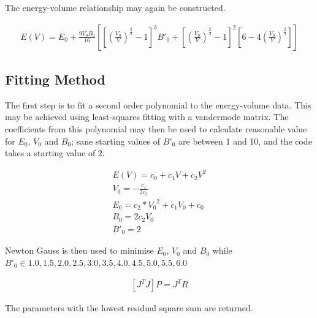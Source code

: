 \documentclass[12pt,twoside]{manual}
\begin{document}
The energy-volume relationship may again be constructed\cite{crystaleos}.

\begin{equation}
\begin{split}
E(V) = E_0 + \frac{9 V_0 B_0}{16} \left[ \left[ \left(\frac{V_0}{V} \right)^{\frac{2}{3}}-1\right]^{3} {B'}_0 + \left[ \left(\frac{V_0}{V} \right)^{\frac{2}{3}}-1\right]^{2} \left[6 - 4 \left(\frac{V_0}{V} \right)^{\frac{2}{3}}\right] \right]
\end{split}
\label{eq:eqMurnachanEquationofStateVolume}
\end{equation}



\subsection{Fitting Method}

The first step is to fit a second order polynomial to the energy-volume data.  This may be achieved using least-squares fitting with a vandermode matrix.  The coefficients from this polynomial may then be used to calculate reasonable value for $E_0$, $V_0$ and $B_0$; sane starting values of ${B'}_0$ are between 1 and 10, and the code takes a starting value of 2\cite{gilgamesheos}.

\begin{equation}
\begin{split}
E(V) = c_0 + c_1 V + c_2 V^2 \\
V_0 = -\frac{c_1}{2c_2} \\
E_0 = c_2 * {V_0}^2 + c_1 V_0 + c_0  \\
B_0 = 2 c_2 V_0 \\
{B'}_0 = 2
\end{split}
\label{eq:eqMurnachanEquationofStateVolume}
\end{equation}

Newton Gauss is then used to minimise $E_0$, $V_0$ and $B_0$ while ${B'}_0 \in {1.0,1.5,2.0,2.5,3.0,3.5,4.0,4.5,5.0,5.5,6.0}$

\begin{equation}
\begin{split}
\left[J^T J\right] P = J^T R
\end{split}
\label{eq:eqMurnachanEquationofStateVolume}
\end{equation}

The parameters with the lowest residual square sum are returned.
\end{document}
